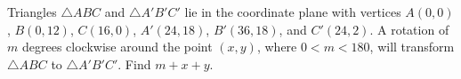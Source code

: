 Triangles $\triangle ABC$ and $\triangle A'B'C'$ lie in the coordinate plane with vertices $A(0,0)$, $B(0,12)$, $C(16,0)$, $A'(24,18)$, $B'(36,18)$, and $C'(24,2)$. A rotation of $m$ degrees clockwise around the point $(x,y)$, where $0<m<180$, will transform $\triangle ABC$ to $\triangle A'B'C'$. Find $m+x+y$.